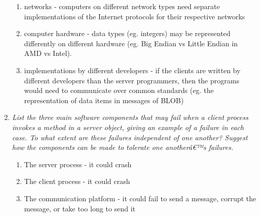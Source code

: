 \documentclass[11pt]{article}
\theoremstyle{plain}
\theoremstyle{definition}
\begin{document}
\begin{enumerate}
\begin{enumerate}[\hspace{0.5cm}(1)]
		\item networks - computers on different network types need separate implementations of the Internet protocols for their respective networks
		\item computer hardware - data types (eg. integers) may be represented differently on different hardware (eg. Big Endian vs Little Endian in AMD vs Intel).
		\item implementations by different developers - if the clients are written by different developers than the server programmers, then the programs would need to communicate over common standards (eg. the representation of data items in messages of BLOB)
	\end{enumerate}
	\item \textit{List the three main software components that may fail when a client process invokes a method in a server object, giving an example of a failure in each case. To what extent are these failures independent of one another? Suggest how the components can be made to tolerate one anotherâ€™s failures.}
	\begin{enumerate}[\hspace{0.5cm}(1)]
		\item The server process - it could crash
		\item The client process - it could crash
		\item The communication platform - it could fail to send a message, corrupt the message, or take too long to send it
		

\end{enumerate}
\end{enumerate}
\end{document}
